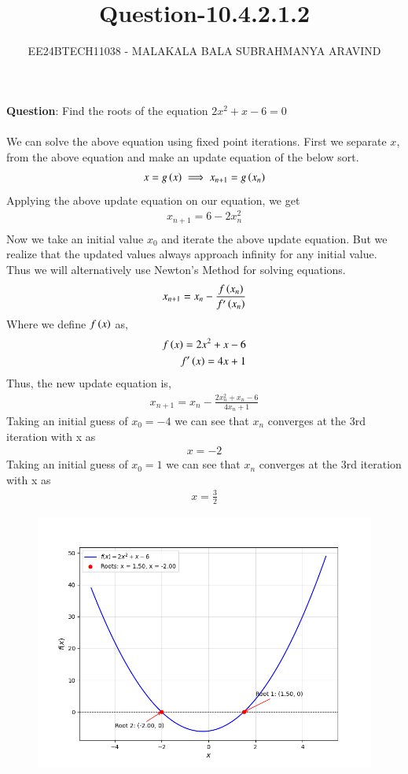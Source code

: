 \documentclass[journal]{IEEEtran}
\numberwithin{equation}{enumi}
\numberwithin{figure}{enumi}
\begin{document}

\title{Question-10.4.2.1.2}
\author{EE24BTECH11038 - MALAKALA BALA SUBRAHMANYA ARAVIND}
{\let\newpage\relax\maketitle}
\textbf{Question}:
Find the roots of the equation $2x^2+x-6=0$\\
\solution \\
We can solve the above equation using fixed point iterations. First we separate $x$, from the above equation and make an update equation of the below sort.
\begin{align}
	x = g\left(x\right) \implies x_{n+1} = g\left(x_n\right)
\end{align}
Applying the above update equation on our equation, we get
\begin{align}
    x_{n+1}=6-2x_n^2\\
\end{align}
Now we take an initial value $x_0$ and iterate the above update equation. But we realize that the updated values always approach infinity for any initial value. \\
Thus we will alternatively use Newton's Method for solving equations.
\begin{align}
	x_{n+1} = x_n - \frac{f\left(x_n\right)}{f^{\prime}\left(x_n\right)} 
\end{align}
Where we define $f\left(x\right)$ as, 
\begin{align}
	f\left(x\right) = 2x^2+x-6 \\
	f^{\prime}\left(x\right) = 4x+1
\end{align}
Thus, the new update equation is, 
\begin{align}
	x_{n+1} = x_n - \frac{2x_n^2+x_n-6}{4x_n+1 } 
\end{align}
Taking an initial guess of $x_0=-4$ we can see that $x_n$ converges at the 3rd iteration with x as
\begin{align}
    x=-2
\end{align}
Taking an initial guess of $x_0=1$ we can see that $x_n$ converges at the 3rd iteration with x as
\begin{align}
    x=\frac{3}{2}
\end{align}
\begin{figure}[h!]
	\centering
	\includegraphics[width=\columnwidth]{figs/Figure_1.png}
	\label{stemplot}
\end{figure}
\end{document}
